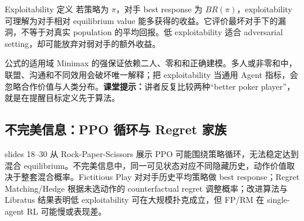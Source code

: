 
\begin{importantbox}{Exploitability 定义}
若策略为 $\pi$，对手 best response 为 $BR(\pi)$，exploitability 可理解为对手相对 equilibrium value 能多获得的收益。它评价最坏对手下的漏洞，不等于对真实 population 的平均回报。低 exploitability 适合 adversarial setting，却可能放弃对弱对手的额外收益。
\end{importantbox}

\begin{warningbox}{公式的适用域}
Minimax 的强保证依赖二人、零和和正确建模。多人或非零和中，联盟、沟通和不同效用会破坏唯一解释；把 exploitability 当通用 Agent 指标，会忽略合作价值与人类分布。\textbf{课堂提示：}讲者反复比较两种“better poker player”，就是在提醒目标定义先于算法。
\end{warningbox}

\subsection{不完美信息：PPO 循环与 Regret 家族}

slides 18--30 从 Rock-Paper-Scissors 展示 PPO 可能围绕策略循环，无法稳定达到混合 equilibrium。不完美信息中，同一可见状态对应不同隐藏历史，动作价值取决于整套混合概率。Fictitious Play 对对手历史平均策略做 best response；Regret Matching/Hedge 根据未选动作的 counterfactual regret 调整概率；改进算法与 Libratus 结果表明低 exploitability 可在大规模扑克成立，但 FP/RM 在 single-agent RL 可能慢或表现差。

